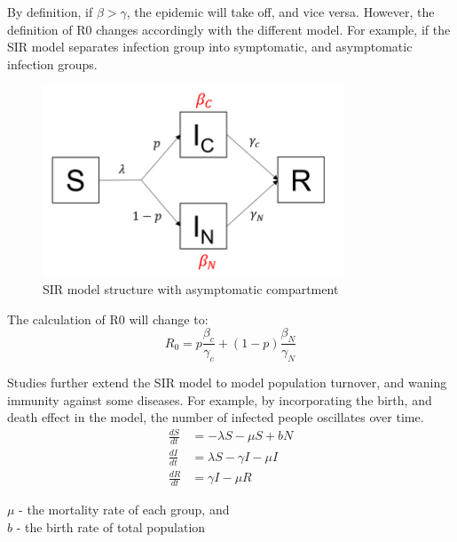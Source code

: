 \documentclass[a4paper, 12pt, twoside]{article}
\begin{document}
By definition, if $\beta > \gamma$, the epidemic will take off, and vice versa.
However, the definition of \gls{R0} changes accordingly with the different model.
For example, if the SIR model separates infection group into symptomatic, and asymptomatic infection groups.
\begin{figure}[htpb]
	\centering
	\includegraphics[width=0.8\textwidth]{sir-model-asymptomatic}
	\caption{SIR model structure with asymptomatic compartment}
	\label{fig:sir_model_structure_with_asymptomatic_compartment}
\end{figure}

The calculation of \gls{R0} will change to:
\begin{equation}
	R_0 = p \frac{\beta_c}{\gamma_c} + (1-p) \frac{\beta_N}{\gamma_N}
\end{equation}

Studies further extend the SIR model to model population turnover, and waning immunity against some diseases.
For example, by incorporating the birth, and death effect in the model, the number of infected people oscillates over time.
\begin{align}
	\frac{dS}{dt} & = - \lambda S - \mu S + bN     \\
	\frac{dI}{dt} & = \lambda S - \gamma I - \mu I \\
	\frac{dR}{dt} & = \gamma I - \mu R
\end{align}
\begin{center}
	$\mu$ - the mortality rate of each group, and \\
	$b$ - the birth rate of total population \\
\end{center}
\end{document}
